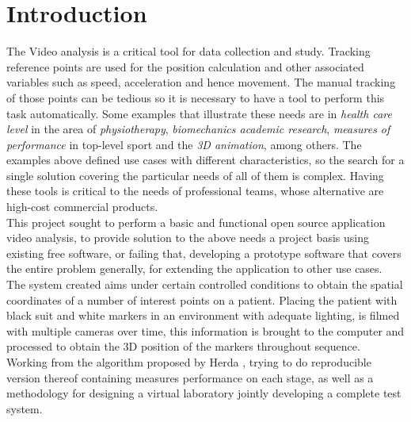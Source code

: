 \section{Introduction}

The Video analysis is a critical tool for data collection and study. Tracking reference points are used for the position calculation and other associated variables such as speed, acceleration and hence movement.
The manual tracking of those points can be tedious so it is necessary to have a tool to perform this task automatically. 
Some examples that illustrate these needs are in \emph{health care level} in the area of \emph{physiotherapy}, \emph{biomechanics academic research},
\emph{measures of performance} in top-level sport and the \emph{3D animation}, among others.
The examples above defined use cases with different characteristics, so the search for a single solution covering the particular needs of all of them is complex. Having these tools is critical to the needs of professional teams, whose alternative are high-cost commercial products.\\
\hspace*{0.5cm}This project sought to perform a basic and functional open source application video analysis, to provide solution to the above needs a project basis using existing free software, or failing that, developing a prototype software that covers the entire problem generally, for extending the application to other use cases.\\
\hspace*{0.5cm}The system created aims under certain controlled conditions to obtain the spatial coordinates of a number of interest points on a patient.
Placing the patient with black suit and white markers in an environment with adequate lighting, is filmed with multiple cameras over time, this information is brought to the computer and processed to obtain the 3D position of the markers throughout sequence.\\
\hspace*{0.5cm}Working from the algorithm proposed by Herda \cite{herda}, trying to do reproducible version thereof containing measures performance on each stage,  as well as a methodology for designing a virtual laboratory jointly developing a complete test system.

